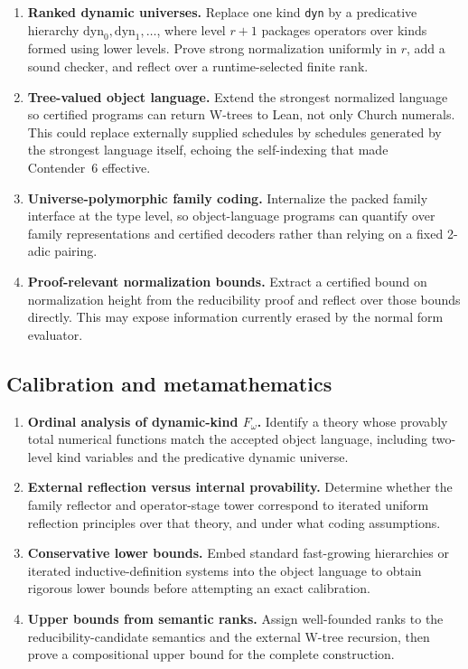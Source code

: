 \documentclass[11pt]{article}
\theoremstyle{definition}
\theoremstyle{remark}
\newcommand{\lean}[1]{\texttt{#1}}
\begin{document}
\begin{enumerate}[leftmargin=*,resume]
\item \textbf{Ranked dynamic universes.}  Replace one kind \lean{dyn} by a
  predicative hierarchy $\mathrm{dyn}_0,\mathrm{dyn}_1,\ldots$, where level
  $r+1$ packages operators over kinds formed using lower levels.  Prove strong
  normalization uniformly in $r$, add a sound checker, and reflect over a
  runtime-selected finite rank.

\item \textbf{Tree-valued object language.}  Extend the strongest normalized
  language so certified programs can return W-trees to Lean, not only Church
  numerals.  This could replace externally supplied schedules by schedules
  generated by the strongest language itself, echoing the self-indexing that
  made Contender~6 effective.

\item \textbf{Universe-polymorphic family coding.}  Internalize the packed
  family interface at the type level, so object-language programs can quantify
  over family representations and certified decoders rather than relying on a
  fixed 2-adic pairing.

\item \textbf{Proof-relevant normalization bounds.}  Extract a certified bound
  on normalization height from the reducibility proof and reflect over those
  bounds directly.  This may expose information currently erased by the normal
  form evaluator.
\end{enumerate}

\subsection{Calibration and metamathematics}

\begin{enumerate}[leftmargin=*,resume]
\item \textbf{Ordinal analysis of dynamic-kind $F_\omega$.}  Identify a theory
  whose provably total numerical functions match the accepted object language,
  including two-level kind variables and the predicative dynamic universe.

\item \textbf{External reflection versus internal provability.}  Determine
  whether the family reflector and operator-stage tower correspond to iterated
  uniform reflection principles over that theory, and under what coding
  assumptions.

\item \textbf{Conservative lower bounds.}  Embed standard fast-growing
  hierarchies or iterated inductive-definition systems into the object language
  to obtain rigorous lower bounds before attempting an exact calibration.

\item \textbf{Upper bounds from semantic ranks.}  Assign well-founded ranks to
  the reducibility-candidate semantics and the external W-tree recursion, then
  prove a compositional upper bound for the complete construction.
\end{enumerate}
\end{document}
